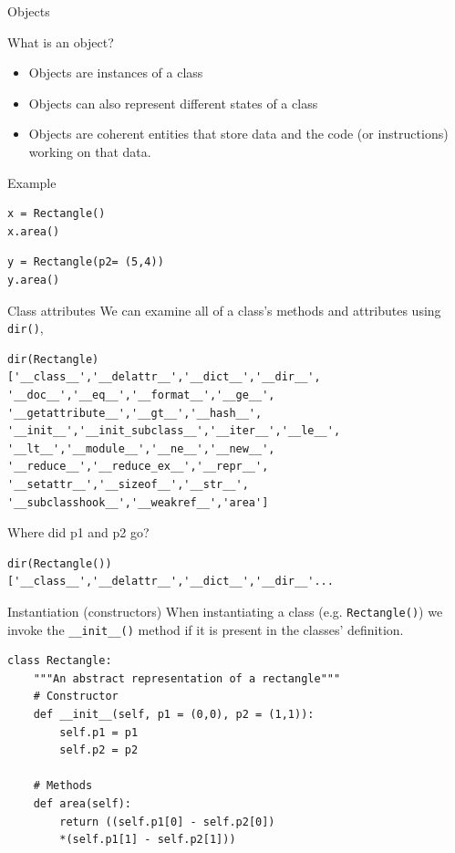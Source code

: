 \documentclass[10pt]{beamer}
\begin{document}
\begin{frame}[fragile]{Objects}
\begin{block}{What is an object?}
\begin{itemize}
	\item Objects are instances of a class
	\item Objects can also represent different states of a class
	\item Objects are coherent entities that store data and the code (or instructions) working on that data. 
\end{itemize}
\end{block}

\begin{block}{Example}
\vspace{0.5cm}
\begin{lstlisting}[style=mypython]
x = Rectangle()
x.area()
\end{lstlisting}

\begin{lstlisting}[style=mypython]
y = Rectangle(p2= (5,4))
y.area()
\end{lstlisting}
\end{block}
\end{frame}


\begin{frame}[fragile]{Class attributes}
We can examine all of a class's methods and attributes using \texttt{dir()},
\begin{lstlisting}[style=mypython]
dir(Rectangle)
['__class__','__delattr__','__dict__','__dir__',
'__doc__','__eq__','__format__','__ge__',
'__getattribute__','__gt__','__hash__',
'__init__','__init_subclass__','__iter__','__le__',
'__lt__','__module__','__ne__','__new__',
'__reduce__','__reduce_ex__','__repr__',
'__setattr__','__sizeof__','__str__',
'__subclasshook__','__weakref__','area']	
\end{lstlisting}
Where did p1 and p2 go?
\begin{lstlisting}[style=mypython]
dir(Rectangle())
['__class__','__delattr__','__dict__','__dir__'...
\end{lstlisting}
\end{frame}

\begin{frame}[fragile]{Instantiation (constructors)}
When instantiating a class (e.g. \texttt{Rectangle()}) we invoke the \texttt{\_\_init\_\_()} method if it is present in the classes' definition.

\vspace{1cm}

\begin{lstlisting}[style=mypython]
class Rectangle:
	"""An abstract representation of a rectangle"""
	# Constructor
	def __init__(self, p1 = (0,0), p2 = (1,1)):
		self.p1 = p1
		self.p2 = p2
	
	# Methods
	def area(self):
		return ((self.p1[0] - self.p2[0])
		*(self.p1[1] - self.p2[1]))
\end{lstlisting}
\end{frame}
\end{document}
